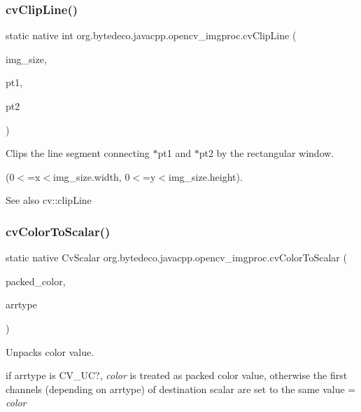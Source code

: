 \subsubsection{\texorpdfstring{cv\+Clip\+Line()}{cvClipLine()}}
{\footnotesize\ttfamily static native int org.\+bytedeco.\+javacpp.\+opencv\+\_\+imgproc.\+cv\+Clip\+Line (\begin{DoxyParamCaption}\item[{@By\+Val Cv\+Size}]{img\+\_\+size,  }\item[{Cv\+Point}]{pt1,  }\item[{Cv\+Point}]{pt2 }\end{DoxyParamCaption})\hspace{0.3cm}{\ttfamily [static]}}



Clips the line segment connecting $\ast$pt1 and $\ast$pt2 by the rectangular window. 

(0$<$=x$<$img\+\_\+size.\+width, 0$<$=y$<$img\+\_\+size.\+height). \begin{DoxySeeAlso}{See also}
cv\+::clip\+Line 
\end{DoxySeeAlso}
\mbox{\label{group__imgproc__c_ga740bdb87be7fa22bb0fda2e620a13777}} 
\subsubsection{\texorpdfstring{cv\+Color\+To\+Scalar()}{cvColorToScalar()}}
{\footnotesize\ttfamily static native Cv\+Scalar org.\+bytedeco.\+javacpp.\+opencv\+\_\+imgproc.\+cv\+Color\+To\+Scalar (\begin{DoxyParamCaption}\item[{double}]{packed\+\_\+color,  }\item[{int}]{arrtype }\end{DoxyParamCaption})\hspace{0.3cm}{\ttfamily [static]}}



Unpacks color value. 

if arrtype is C\+V\+\_\+UC?, {\itshape color} is treated as packed color value, otherwise the first channels (depending on arrtype) of destination scalar are set to the same value = {\itshape color} \mbox{\label{group__imgproc__c_gae639bb492f6f6f8434a3bf4a6ae085c9}} 
